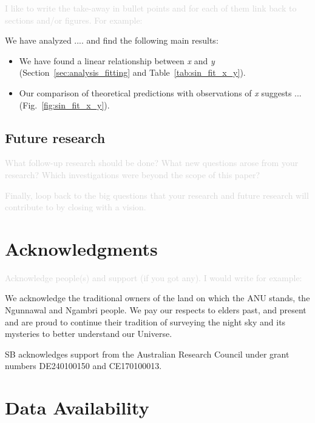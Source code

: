\documentclass[fleqn,usenatbib]{mnras}
\newcommand{\comment}[1]{\textcolor{lightgray}{#1}}
\begin{document}
\comment{I like to write the take-away in bullet points and for each of them link back to sections and/or figures. For example:}

We have analyzed .... and find the following main results:
\begin{itemize}
    \item We have found a linear relationship between \textit{x} and \textit{y} (Section~\ref{sec:analysis_fitting} and Table~\ref{tab:sin_fit_x_y}).
    \item Our comparison of theoretical predictions with observations of  \textit{x} suggests ... (Fig.~\ref{fig:sin_fit_x_y}).
\end{itemize}

\subsection{Future research} \label{sec:conclusions_future_research}

\comment{What follow-up research should be done? What new questions arose from your research? Which investigations were beyond the scope of this paper?}

\comment{Finally, loop back to the big questions that your research and future research will contribute to by closing with a vision.}

\clearpage

\section*{Acknowledgments}

\comment{Acknowledge people(s) and support (if you got any). I would write for example:}

We acknowledge the traditional owners of the land on which the ANU stands, the Ngunnawal and Ngambri people. We pay our respects to elders past, and present and are proud to continue their tradition of surveying the night sky and its mysteries to better understand our Universe.

SB acknowledges support from the Australian Research Council under grant numbers DE240100150 and CE170100013.

\section*{Data Availability}
\end{document}
